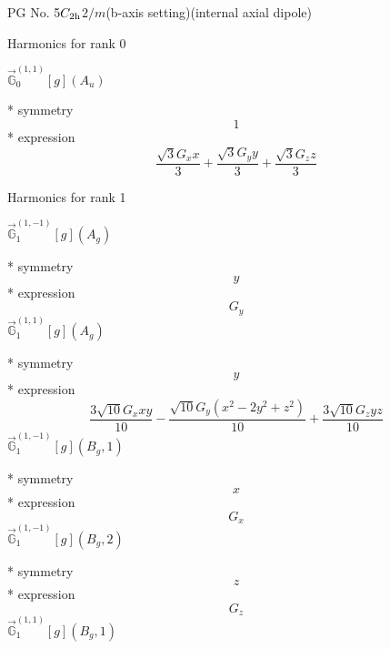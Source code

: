 \documentclass[fleqn,8pt]{jsarticle}
\begin{document}
\setcounter{MaxMatrixCols}{32}

\renewcommand{\tablename}{Table~}
\renewcommand{\figurename}{Figure~}
\begin{center}
\LARGE
PG No. 5\quad$C_{\rm 2h}$\quad$2/m$\quad(b-axis setting)\quad[ monoclinic ] (internal axial dipole)
\end{center}

\noindent * Harmonics for rank 0

\noindent\quad $\vec{\mathbb{G}}_{0}^{(1,1)}[g](A_{u})$

\noindent\quad ** symmetry
\begin{dmath*}
1
\end{dmath*}
\noindent\quad ** expression
\begin{dmath*}
\frac{\sqrt{3} G_{x} x}{3} + \frac{\sqrt{3} G_{y} y}{3} + \frac{\sqrt{3} G_{z} z}{3}
\end{dmath*}

\noindent * Harmonics for rank 1

\noindent\quad $\vec{\mathbb{G}}_{1}^{(1,-1)}[g](A_{g})$

\noindent\quad ** symmetry
\begin{dmath*}
y
\end{dmath*}
\noindent\quad ** expression
\begin{dmath*}
G_{y}
\end{dmath*}
\noindent\quad $\vec{\mathbb{G}}_{1}^{(1,1)}[g](A_{g})$

\noindent\quad ** symmetry
\begin{dmath*}
y
\end{dmath*}
\noindent\quad ** expression
\begin{dmath*}
\frac{3 \sqrt{10} G_{x} x y}{10} - \frac{\sqrt{10} G_{y} \left(x^{2} - 2 y^{2} + z^{2}\right)}{10} + \frac{3 \sqrt{10} G_{z} y z}{10}
\end{dmath*}
\noindent\quad $\vec{\mathbb{G}}_{1}^{(1,-1)}[g](B_{g},1)$

\noindent\quad ** symmetry
\begin{dmath*}
x
\end{dmath*}
\noindent\quad ** expression
\begin{dmath*}
G_{x}
\end{dmath*}
\noindent\quad $\vec{\mathbb{G}}_{1}^{(1,-1)}[g](B_{g},2)$

\noindent\quad ** symmetry
\begin{dmath*}
z
\end{dmath*}
\noindent\quad ** expression
\begin{dmath*}
G_{z}
\end{dmath*}
\noindent\quad $\vec{\mathbb{G}}_{1}^{(1,1)}[g](B_{g},1)$
\end{document}
